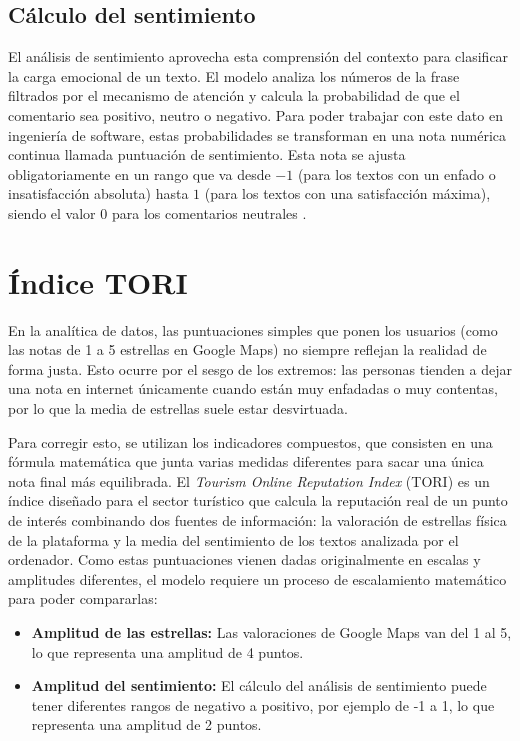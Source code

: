 \subsection{Cálculo del sentimiento}
El análisis de sentimiento aprovecha esta comprensión del contexto para clasificar la carga emocional de un texto. El modelo analiza los números de la frase filtrados por el mecanismo de atención y calcula la probabilidad de que el comentario sea positivo, neutro o negativo. Para poder trabajar con este dato en ingeniería de software, estas probabilidades se transforman en una nota numérica continua llamada puntuación de sentimiento. Esta nota se ajusta obligatoriamente en un rango que va desde $-1$ (para los textos con un enfado o insatisfacción absoluta) hasta $1$ (para los textos con una satisfacción máxima), siendo el valor $0$ para los comentarios neutrales \cite{pysentimiento_git}.

\section{Índice TORI}
En la analítica de datos, las puntuaciones simples que ponen los usuarios (como las notas de 1 a 5 estrellas en Google Maps) no siempre reflejan la realidad de forma justa. Esto ocurre por el sesgo de los extremos: las personas tienden a dejar una nota en internet únicamente cuando están muy enfadadas o muy contentas, por lo que la media de estrellas suele estar desvirtuada.

Para corregir esto, se utilizan los indicadores compuestos, que consisten en una fórmula matemática que junta varias medidas diferentes para sacar una única nota final más equilibrada. El \textit{Tourism Online Reputation Index} (TORI) es un índice diseñado para el sector turístico que calcula la reputación real de un punto de interés combinando dos fuentes de información: la valoración de estrellas física de la plataforma y la media del sentimiento de los textos analizada por el ordenador. Como estas puntuaciones vienen dadas originalmente en escalas y amplitudes diferentes, el modelo requiere un proceso de escalamiento matemático para poder compararlas:

\begin{itemize}
    \item \textbf{Amplitud de las estrellas:} Las valoraciones de Google Maps van del 1 al 5, lo que representa una amplitud de 4 puntos.
    \item \textbf{Amplitud del sentimiento:} El cálculo del análisis de sentimiento puede tener diferentes rangos de negativo a positivo, por ejemplo de -1 a 1, lo que representa una amplitud de 2 puntos.
\end{itemize}

